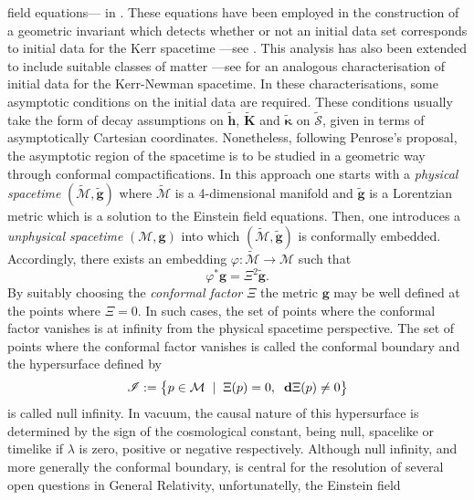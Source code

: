 \documentclass[10pt,a4paper]{article}
\theoremstyle{plain}
\def\bmg{{\bm g}}
\def\bmh{{\bm h}}
\def\bmK{{\bm K}}
\begin{document}
field equations--- in \cite{GarVal08c}.  These equations have been
employed in the construction of a geometric invariant which detects
whether or not an initial data set corresponds to initial data for the
Kerr spacetime ---see \cite{BaeVal10a,BaeVal10b,BaeVal10c,BaeVal11b}.
This analysis has also been extended to include suitable classes of
matter ---see \cite{ValCol16} for an analogous characterisation of
initial data for the Kerr-Newman spacetime.  In these
characterisations, some asymptotic conditions on the initial data are
required. These conditions usually take the form of decay assumptions
on $\tilde{\bmh}$, $\tilde{\bmK}$ and $\tilde{\bm\kappa}$ on
$\tilde{\mathcal{S}}$, given in terms of asymptotically Cartesian
coordinates.  Nonetheless, following Penrose's proposal, the
asymptotic region of the spacetime is to be studied in a geometric way
through conformal compactifications.  In this approach one starts with
a \emph{physical spacetime} $(\tilde{\mathcal{M}},\tilde{\bmg})$ where
$\tilde{\mathcal{M}}$ is a 4-dimensional manifold and $\tilde{\bmg}$
is a Lorentzian metric which is a solution to the Einstein field
equations.  Then, one introduces a \emph{unphysical spacetime}
$(\mathcal{M},\bmg)$ into which $(\tilde{\mathcal{M}},\tilde{\bmg})$
is conformally embedded.  Accordingly, there exists an embedding
$\varphi: \tilde{\mathcal{M}} \rightarrow \mathcal{M}$ such that
\begin{equation} \label{eqn:Chapter:Introduction:ConformalRescaling}
\varphi^{*}\bmg=\Xi^2\tilde{\bmg}.
\end{equation}
 By suitably choosing the \emph{conformal factor} $\Xi$ the metric
 $\bmg$ may be well defined at the points where $\Xi=0$. In such
 cases, the set of points where the conformal factor vanishes is
 at infinity from the physical spacetime perspective.
 \noindent The set of points where the conformal factor vanishes
 is called the conformal boundary and the hypersurface defined by
\[
 \mathscr{I} := \big\{p \in \mathcal{M} \hspace{0.2cm}| \hspace{0.2cm}
 \Xi(p)=0 , \hspace{0.2cm} \mathbf{d}\Xi(p) \neq0\big\}
\]
is called null infinity. In vacuum, the causal nature of this
hypersurface is determined by the sign of the cosmological constant,
being null, spacelike or timelike if $\lambda$ is zero, positive or
negative respectively.  Although null infinity, and more generally the
conformal boundary, is central for the resolution of several open
questions in General Relativity, unfortunatelly, the Einstein field
\end{document}
